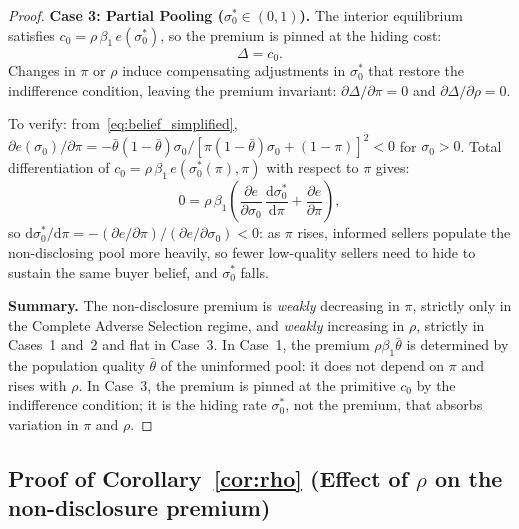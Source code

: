 \documentclass[10pt,letterpaper]{bp-template-concise}
\begin{document}
\begin{proof}
\medskip
\textbf{Case 3: Partial Pooling ($\sigma_0^*\in(0,1)$).}
The interior equilibrium satisfies $c_0=\rho\,\beta_1\,e(\sigma_0^*)$, so the premium is pinned at the hiding cost:
\begin{equation}
    \Delta = c_0.
\end{equation}
Changes in $\pi$ or $\rho$ induce compensating adjustments in $\sigma_0^*$ that restore the indifference condition, leaving the premium invariant: $\partial\Delta/\partial\pi=0$ and $\partial\Delta/\partial\rho=0$.

To verify: from~\eqref{eq:belief_simplified}, $\partial e(\sigma_0)/\partial\pi = -\bar{\theta}(1-\bar{\theta})\sigma_0/[\pi(1-\bar{\theta})\sigma_0+(1-\pi)]^2 < 0$ for $\sigma_0>0$. Total differentiation of $c_0=\rho\,\beta_1\,e(\sigma_0^*(\pi),\pi)$ with respect to $\pi$ gives:
\begin{equation}
    0 = \rho\,\beta_1\left(\frac{\partial e}{\partial\sigma_0}\,\frac{\mathrm{d}\sigma_0^*}{\mathrm{d}\pi} + \frac{\partial e}{\partial\pi}\right),
\end{equation}
so $\mathrm{d}\sigma_0^*/\mathrm{d}\pi = -(\partial e/\partial\pi)/(\partial e/\partial\sigma_0) < 0$: as $\pi$ rises, informed sellers populate the non-disclosing pool more heavily, so fewer low-quality sellers need to hide to sustain the same buyer belief, and $\sigma_0^*$ falls.

\medskip
\textbf{Summary.} The non-disclosure premium is \emph{weakly} decreasing in $\pi$, strictly only in the Complete Adverse Selection regime, and \emph{weakly} increasing in $\rho$, strictly in Cases~1 and~2 and flat in Case~3. In Case~1, the premium $\rho\beta_1\bar{\theta}$ is determined by the population quality $\bar{\theta}$ of the uninformed pool: it does not depend on $\pi$ and rises with $\rho$. In Case~3, the premium is pinned at the primitive $c_0$ by the indifference condition; it is the hiding rate $\sigma_0^*$, not the premium, that absorbs variation in $\pi$ and $\rho$.
\end{proof}

\subsection*{Proof of Corollary~\ref{cor:rho} (Effect of $\rho$ on the non-disclosure premium)}
\end{document}
